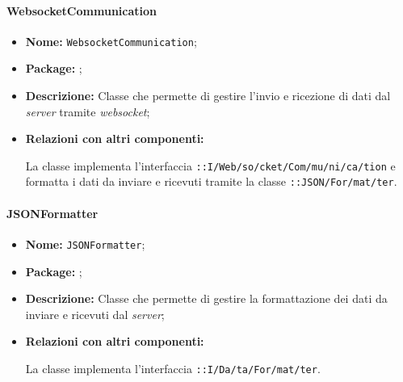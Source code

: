 \paragraph{WebsocketCommunication}
\begin{flushleft}
\begin{itemize}
\item \textbf{Nome:} \texttt{WebsocketCommunication};
\item \textbf{Package:} \texttt{\serverCommunication{}};
\item \textbf{Descrizione:} Classe che permette di gestire l'invio e ricezione di dati dal \textit{server} tramite \textit{websocket};
\item \textbf{Relazioni con altri componenti:}
\begin{sloppypar}
La classe implementa l'interfaccia \texttt{\iServerCommunication{}::I\fshyp{}Web\fshyp{}so\fshyp{}cket\fshyp{}Com\fshyp{}mu\fshyp{}ni\fshyp{}ca\fshyp{}tion} e formatta i dati da inviare e ricevuti tramite la classe \texttt{\serverCommunication{}::JSON\fshyp{}For\fshyp{}mat\fshyp{}ter}.
\end{sloppypar}
\end{itemize}
\end{flushleft}

\paragraph{JSONFormatter}
\begin{flushleft}
\begin{itemize}
\item \textbf{Nome:} \texttt{JSONFormatter};
\item \textbf{Package:} \texttt{\serverCommunication{}};
\item \textbf{Descrizione:} Classe che permette di gestire la formattazione dei dati da inviare e ricevuti dal \textit{server};
\item \textbf{Relazioni con altri componenti:}
\begin{sloppypar}
La classe implementa l'interfaccia \texttt{\iServerCommunication{}::I\fshyp{}Da\fshyp{}ta\fshyp{}For\fshyp{}mat\fshyp{}ter}.
\end{sloppypar}
\end{itemize}
\end{flushleft}
